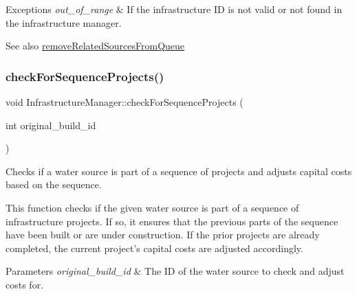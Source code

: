 \begin{DoxyExceptions}{Exceptions}
{\em out\+\_\+of\+\_\+range} & If the infrastructure ID is not valid or not found in the infrastructure manager.\\
\hline
\end{DoxyExceptions}
\begin{DoxySeeAlso}{See also}
\mbox{\hyperlink{classInfrastructureManager_abf6d8d9891abddfe08df0bb7677eee35}{remove\+Related\+Sources\+From\+Queue}} 
\end{DoxySeeAlso}
\mbox{\label{classInfrastructureManager_a4eca31074654eb197ba33342eee3bd32}} 
\subsubsection{\texorpdfstring{check\+For\+Sequence\+Projects()}{checkForSequenceProjects()}}
{\footnotesize\ttfamily void Infrastructure\+Manager\+::check\+For\+Sequence\+Projects (\begin{DoxyParamCaption}\item[{int}]{original\+\_\+build\+\_\+id }\end{DoxyParamCaption})}



Checks if a water source is part of a sequence of projects and adjusts capital costs based on the sequence. 

This function checks if the given water source is part of a sequence of infrastructure projects. If so, it ensures that the previous parts of the sequence have been built or are under construction. If the prior projects are already completed, the current project’s capital costs are adjusted accordingly.


\begin{DoxyParams}{Parameters}
{\em original\+\_\+build\+\_\+id} & The ID of the water source to check and adjust costs for.\\
\hline
\end{DoxyParams}

